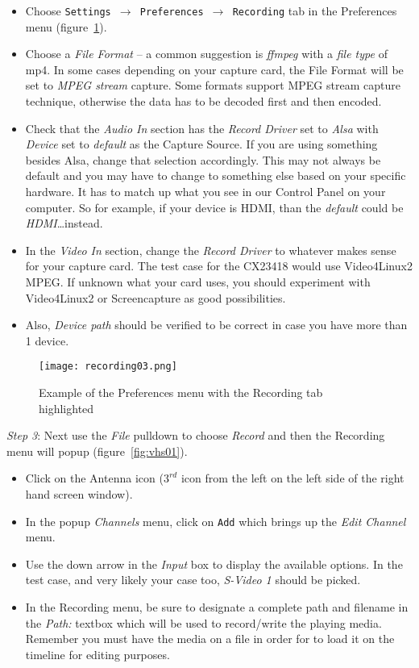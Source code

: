 \begin{itemize}
    \item Choose \texttt{Settings $\rightarrow$ Preferences $\rightarrow$ Recording} tab in the Preferences menu (figure~\ref{fig:recordingx}).
    \item Choose a \textit{File Format} -- a common suggestion is \textit{ffmpeg} with a \textit{file type} of mp4.  In some cases depending on your capture card, the File Format will be set to \textit{MPEG stream} capture. Some formats support MPEG stream capture technique, otherwise the data has to be decoded first and then encoded.
    \item Check that the \textit{Audio In} section has the \textit{Record Driver} set to \textit{Alsa} with \textit{Device} set to \textit{default} as the Capture Source.  If you are using something besides Alsa, change that selection accordingly. This may not always be default and you may have to change to something else based on your specific hardware. It has to match up what you see in our Control Panel on your computer. So for example, if your device is HDMI, than the \textit{default} could be \textit{HDMI}\dots instead.
    \item In the \textit{Video In} section, change the\textit{ Record Driver} to whatever makes sense for your capture card. The test case for the CX23418 would use Video4Linux2 MPEG. If unknown what your card uses, you should experiment with Video4Linux2 or Screencapture as good possibilities.
    \item Also, \textit{Device path} should be verified to be correct in case you have more than 1 device.
\end{itemize}

\begin{figure}[htpb]
    \centering
    \texttt{[image: recording03.png]}
    \caption{Example of the Preferences menu with the Recording tab highlighted}
    \label{fig:recordingx}
\end{figure}

\textit{Step 3}: Next use the \textit{File} pulldown to choose \textit{Record} and then the Recording menu will popup (figure~\ref{fig:vhs01}).

\begin{itemize}
    \item Click on the Antenna icon ($3^{rd}$ icon from the left on the left side of the right hand screen window).
    \item In the popup \textit{Channels} menu, click on \texttt{Add} which brings up the \textit{Edit Channel} menu.
    \item Use the down arrow in the \textit{Input} box to display the available options.  In the test case, and very likely your case too, \textit{S-Video 1} should be picked.
    \item In the Recording menu, be sure to designate a complete path and filename in the \textit{Path:} textbox which will be used to record/write the playing media.  Remember you must have the media on a file in order for \CGG{} to load it on the timeline for editing purposes.    
\end{itemize}

